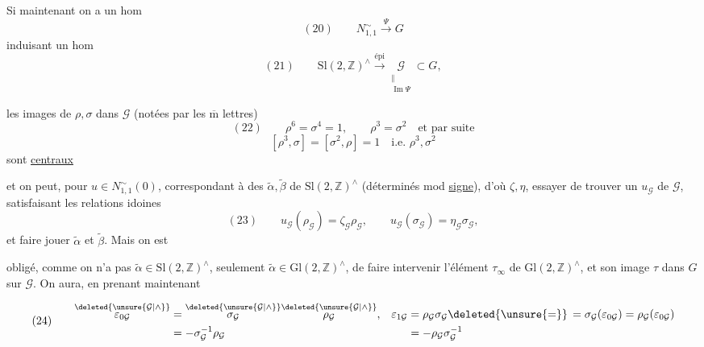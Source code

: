 Si maintenant on a un hom 
\[
(20)\qquad N_{1,1}^{\sim}\xrightarrow{\Psi}G
\]
induisant un hom
\[
(21)\qquad
\mathrm{Sl}(2,\mathbb Z)^\wedge
\xrightarrow{\text{épi}}
\underset{\substack{\Vert\\\operatorname{Im}\Psi}}{\mathcal{G}}
\subset G,
\]

les images de $\rho,\sigma$ dans $\mathcal{G}$
(notées par les $\overline{\mathrm m}$ lettres)
\[
(22)\qquad
\rho^6=\sigma^4=1,\qquad
\rho^3=\sigma^2\quad\text{et par suite}
\]
\[
[\rho^3,\sigma]=[\sigma^2,\rho]=1
\quad\text{i.e. }\rho^3,\sigma^2
\]
sont \uline{centraux}


et on peut, pour $u\in N_{1,1}^{\sim}(0)$, correspondant à des
 $\widetilde{\alpha},\widetilde{\beta}$ de
$\mathrm{Sl}(2,\mathbb Z)^\wedge$
(déterminés mod \uline{signe}), d'où $\zeta,\eta$,
essayer de trouver un 
$u_{\mathcal{G}}$ de $\mathcal{G}$,
satisfaisant les relations idoines
\[
(23)\qquad
u_{\mathcal{G}}(\rho_{\mathcal{G}})
=\zeta_{\mathcal{G}}\rho_{\mathcal{G}},\qquad
u_{\mathcal{G}}(\sigma_{\mathcal{G}})
=\eta_{\mathcal{G}}\sigma_{\mathcal{G}},
\]
et faire jouer  $\widetilde{\alpha}$ et
$\widetilde{\beta}$. Mais on est



obligé, comme  on n'a pas
$\widetilde{\alpha}\in\mathrm{Sl}(2,\mathbb Z)^\wedge$,
seulement $\widetilde{\alpha}\in\mathrm{Gl}(2,\mathbb Z)^\wedge$,
de faire intervenir l'élément $\tau_\infty$ de
$\mathrm{Gl}(2,\mathbb Z)^\wedge$,
et  son image $\tau$ dans $G$ sur
$\mathcal{G}$. On aura, en prenant maintenant

\[
(24)\qquad
\begin{aligned}
\overset{\deleted{\unsure{\mathcal{G}|\wedge}}}{\varepsilon_{0\mathcal{G}}}
&=\overset{\deleted{\unsure{\mathcal{G}|\wedge}}}{\sigma_{\mathcal{G}}}
\overset{\deleted{\unsure{\mathcal{G}|\wedge}}}{\rho_{\mathcal{G}}},
&\varepsilon_{1\mathcal{G}}&=\rho_{\mathcal{G}}\sigma_{\mathcal{G}}
\deleted{\unsure{=}}\,=\sigma_{\mathcal{G}}(\varepsilon_{0\mathcal{G}})
=\rho_{\mathcal{G}}(\varepsilon_{0\mathcal{G}})\\
&=-\sigma_{\mathcal{G}}^{-1}\rho_{\mathcal{G}}
&&=-\rho_{\mathcal{G}}\sigma_{\mathcal{G}}^{-1}
\end{aligned}
\]

